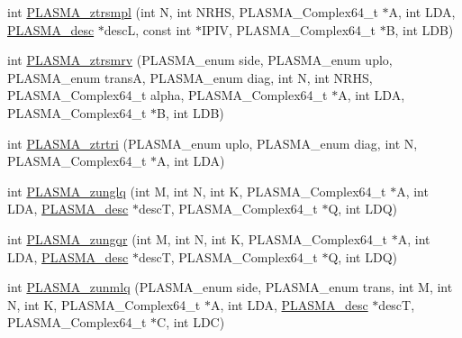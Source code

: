 \begin{DoxyCompactItemize}
int \hyperlink{group__PLASMA__Complex64__t_gac8d8e79226587e10e5dc5fddae448769_gac8d8e79226587e10e5dc5fddae448769}{P\+L\+A\+S\+M\+A\+\_\+ztrsmpl} (int N, int N\+R\+H\+S, P\+L\+A\+S\+M\+A\+\_\+\+Complex64\+\_\+t $\ast$A, int L\+D\+A, \hyperlink{structplasma__desc__t}{P\+L\+A\+S\+M\+A\+\_\+desc} $\ast$desc\+L, const int $\ast$I\+P\+I\+V, P\+L\+A\+S\+M\+A\+\_\+\+Complex64\+\_\+t $\ast$B, int L\+D\+B)
\item 
int \hyperlink{group__PLASMA__Complex64__t_gadc613ba744f045286d0869bbbf6765ac_gadc613ba744f045286d0869bbbf6765ac}{P\+L\+A\+S\+M\+A\+\_\+ztrsmrv} (P\+L\+A\+S\+M\+A\+\_\+enum side, P\+L\+A\+S\+M\+A\+\_\+enum uplo, P\+L\+A\+S\+M\+A\+\_\+enum trans\+A, P\+L\+A\+S\+M\+A\+\_\+enum diag, int N, int N\+R\+H\+S, P\+L\+A\+S\+M\+A\+\_\+\+Complex64\+\_\+t alpha, P\+L\+A\+S\+M\+A\+\_\+\+Complex64\+\_\+t $\ast$A, int L\+D\+A, P\+L\+A\+S\+M\+A\+\_\+\+Complex64\+\_\+t $\ast$B, int L\+D\+B)
\item 
int \hyperlink{group__PLASMA__Complex64__t_gaf634d0dec7f2b59a571b5aafa19892d1_gaf634d0dec7f2b59a571b5aafa19892d1}{P\+L\+A\+S\+M\+A\+\_\+ztrtri} (P\+L\+A\+S\+M\+A\+\_\+enum uplo, P\+L\+A\+S\+M\+A\+\_\+enum diag, int N, P\+L\+A\+S\+M\+A\+\_\+\+Complex64\+\_\+t $\ast$A, int L\+D\+A)
\item 
int \hyperlink{group__PLASMA__Complex64__t_ga8d2c7940bdd249a0a1e633b0ac6d107c_ga8d2c7940bdd249a0a1e633b0ac6d107c}{P\+L\+A\+S\+M\+A\+\_\+zunglq} (int M, int N, int K, P\+L\+A\+S\+M\+A\+\_\+\+Complex64\+\_\+t $\ast$A, int L\+D\+A, \hyperlink{structplasma__desc__t}{P\+L\+A\+S\+M\+A\+\_\+desc} $\ast$desc\+T, P\+L\+A\+S\+M\+A\+\_\+\+Complex64\+\_\+t $\ast$Q, int L\+D\+Q)
\item 
int \hyperlink{group__PLASMA__Complex64__t_gafedf859d9373a2738b24e5780360ec5b_gafedf859d9373a2738b24e5780360ec5b}{P\+L\+A\+S\+M\+A\+\_\+zungqr} (int M, int N, int K, P\+L\+A\+S\+M\+A\+\_\+\+Complex64\+\_\+t $\ast$A, int L\+D\+A, \hyperlink{structplasma__desc__t}{P\+L\+A\+S\+M\+A\+\_\+desc} $\ast$desc\+T, P\+L\+A\+S\+M\+A\+\_\+\+Complex64\+\_\+t $\ast$Q, int L\+D\+Q)
\item 
int \hyperlink{group__PLASMA__Complex64__t_ga2c015740671fa101298fb9841b25f5d2_ga2c015740671fa101298fb9841b25f5d2}{P\+L\+A\+S\+M\+A\+\_\+zunmlq} (P\+L\+A\+S\+M\+A\+\_\+enum side, P\+L\+A\+S\+M\+A\+\_\+enum trans, int M, int N, int K, P\+L\+A\+S\+M\+A\+\_\+\+Complex64\+\_\+t $\ast$A, int L\+D\+A, \hyperlink{structplasma__desc__t}{P\+L\+A\+S\+M\+A\+\_\+desc} $\ast$desc\+T, P\+L\+A\+S\+M\+A\+\_\+\+Complex64\+\_\+t $\ast$C, int L\+D\+C)
\item 

\end{DoxyCompactItemize}
